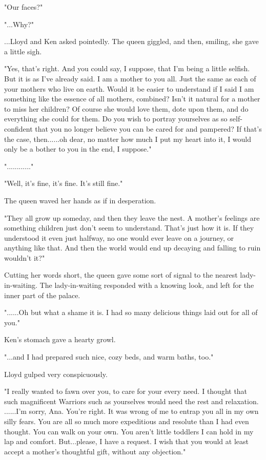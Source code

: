 \documentclass[
]{article}
\begin{document}
"Our faces?"

"...Why?"

...Lloyd and Ken asked pointedly. The queen giggled, and then, smiling,
she gave a little sigh.

"Yes, that's right. And you could say, I suppose, that I'm being a
little selfish. But it is as I've already said. I am a mother to you
all. Just the same as each of your mothers who live on earth. Would it
be easier to understand if I said I am something like the essence of all
mothers, combined? Isn't it natural for a mother to miss her children?
Of course she would love them, dote upon them, and do everything she
could for them. Do you wish to portray yourselves as so self-confident
that you no longer believe you can be cared for and pampered? If that's
the case, then......oh dear, no matter how much I put my heart into it,
I would only be a bother to you in the end, I suppose."

"............"

"Well, it's fine, it's fine. It's still fine."

The queen waved her hands as if in desperation.

"They all grow up someday, and then they leave the nest. A mother's
feelings are something children just don't seem to understand. That's
just how it is. If they understood it even just halfway, no one would
ever leave on a journey, or anything like that. And then the world would
end up decaying and falling to ruin wouldn't it?"

Cutting her words short, the queen gave some sort of signal to the
nearest lady-in-waiting. The lady-in-waiting responded with a knowing
look, and left for the inner part of the palace.

"......Oh but what a shame it is. I had so many delicious things laid
out for all of you."

Ken's stomach gave a hearty growl.

"...and I had prepared such nice, cozy beds, and warm baths, too."

Lloyd gulped very conspicuously.

"I really wanted to fawn over you, to care for your every need. I
thought that such magnificent Warriors such as yourselves would need the
rest and relaxation. ......I'm sorry, Ana. You're right. It was wrong of
me to entrap you all in my own silly fears. You are all so much more
expeditious and resolute than I had even thought. You can walk on your
own. You aren't little toddlers I can hold in my lap and comfort.
But...please, I have a request. I wish that you would at least accept a
mother's thoughtful gift, without any objection."
\end{document}
